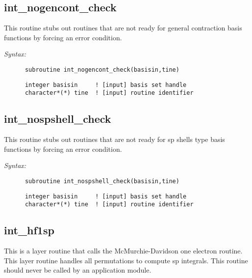 \subsection{int\_nogencont\_check} 
This routine stubs out routines that are not ready for  
general contraction basis functions by forcing an error  
condition. 
 
{\it Syntax:} 
\begin{verbatim} 
      subroutine int_nogencont_check(basisin,tine) 
\end{verbatim} 
\begin{verbatim} 
      integer basisin     ! [input] basis set handle 
      character*(*) tine  ! [input] routine identifier 
\end{verbatim} 
\subsection{int\_nospshell\_check} 
This routine stubs out routines that are not ready for  
sp shells type basis functions by forcing an error  
condition. 
 
{\it Syntax:} 
\begin{verbatim} 
      subroutine int_nospshell_check(basisin,tine) 
\end{verbatim} 
\begin{verbatim} 
      integer basisin     ! [input] basis set handle 
      character*(*) tine  ! [input] routine identifier 
\end{verbatim} 
\subsection{int\_hf1sp} 
This is a layer routine that calls the  
McMurchie-Davidson one electron routine.  This layer 
routine handles all permutations to compute sp integrals. 
This routine should never be called by an application module. 
 
